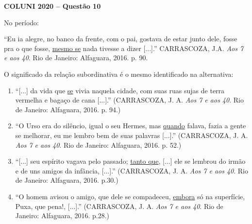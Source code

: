 \textbf{COLUNI 2020 -- Questão 10}\par\medskip No período:

\par

“Eu ia alegre, no banco da frente, com o pai, gostava de estar junto dele, fosse pra o que fosse, \underline{mesmo se} nada tivesse a dizer [...].” CARRASCOZA, J.A. \textit{Aos 7 e aos 40}. Rio de Janeiro: Alfaguara, 2016. p. 90.

\par

O significado da relação subordinativa é o mesmo identificado na alternativa:\begin{enumerate}
\item “[...] da vida que \underline{se} vivia naquela cidade, com suas ruas sujas de terra vermelha e bagaço de cana [...].”
        (CARRASCOZA, J. A. \textit{Aos 7 e aos 40}. Rio de Janeiro: Alfaguara, 2016. p. 94.)
\item “O Urso era do silêncio, igual o seu Hermes, mas \underline{quando} falava, fazia a gente se melhorar, eu me lembro
       bem de suas palavras [...].” (CARRASCOZA, J. A. \textit{Aos 7 e aos 40}. Rio de Janeiro: Alfaguara, 2016. p. 52.)
\item “[...] seu espírito vagava pelo passado; \underline{tanto que}, [...] ele se lembrou do irmão e de uns amigos da
       infância, [...].” (CARRASCOZA, J. A. \textit{Aos 7 e aos 40}. Rio de Janeiro: Alfaguara, 2016. p.30.)
\item “O homem avisou o amigo, que dele se compadeceu, \underline{embora} só na superfície, Puxa, que pena!, [...].”
        (CARRASCOZA, J. A. \textit{Aos 7 e aos 40}. Rio de Janeiro: Alfaguara, 2016. p.28.)\end{enumerate}
